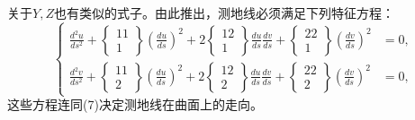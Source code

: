 关于\(Y,Z\)也有类似的式子。由此推出，测地线必须满足下列特征方程：
\begin{equation}\tag{8}
\left\{\begin{aligned}
 \frac{d^2u}{ds^2}+\left\{\begin{matrix}11\\1\end{matrix}\right\}\left(\frac{du}{ds}\right)^2+2\left\{\begin{matrix}12\\1\end{matrix}\right\}\frac{du}{ds}\frac{dv}{ds}+\left\{\begin{matrix}22\\1\end{matrix}\right\}\left(\frac{dv}{ds}\right)^2&=0,\\
 \frac{d^2v}{ds^2}+\left\{\begin{matrix}11\\2\end{matrix}\right\}\left(\frac{du}{ds}\right)^2+2\left\{\begin{matrix}12\\2\end{matrix}\right\}\frac{du}{ds}\frac{dv}{ds}+\left\{\begin{matrix}22\\2\end{matrix}\right\}\left(\frac{dv}{ds}\right)^2&=0,
\end{aligned}\right.
\end{equation}
这些方程连同(7)决定测地线在曲面上的走向。

